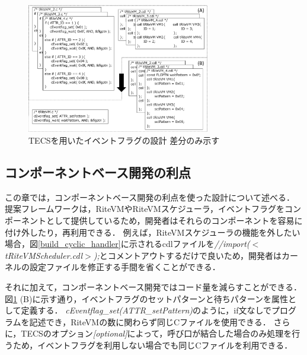 \documentclass[submit,techrep]{ipsj}
\begin{document}
\begin{figure}[t]
    \centering
    \includegraphics[width=8cm,clip]{../EMSOFT2016/figure/Eventflag.pdf}
    \vspace{-2mm}
    \caption{TECSを用いたイベントフラグの設計 {\scriptsize *差分のみ示す}}
\vspace{-3mm}
    \label{fig:Eventflag}
\end{figure}
\vspace{-5mm}
\subsection{コンポーネントベース開発の利点}
この章では，コンポーネントベース開発の利点を使った設計について述べる．
提案フレームワークは，RiteVMやRiteVMスケジューラ，イベントフラグをコンポーネントとして提供しているため，開発者はそれらのコンポーネントを容易に付け外したり，再利用できる．
例えば，RiteVMスケジューラの機能を外したい場合，図\ref{build_cyclic_handler}に示されるcdlファイルを{\it //import($<$tRiteVMScheduler.cdl$>$);}とコメントアウトするだけで良いため，開発者はカーネルの設定ファイルを修正する手間を省くことができる．

それに加えて，コンポーネントベース開発ではコード量を減らすことができる．
図\ref{fig:Eventflag} (B)に示す通り，イベントフラグのセットパターンと待ちパターンを属性として定義する．
{\it cEventflag\_set(ATTR\_setPattern)}のように，if文なしでプログラムを記述でき，RiteVMの数に関わらず同じCファイルを使用できる．
さらに，TECSのオプション{\it [optional]}によって，呼び口が結合した場合のみ処理を行うため，イベントフラグを利用しない場合でも同じCファイルを利用できる．

\vspace{-2mm}
\end{document}
